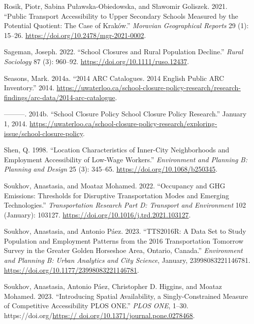 \documentclass[
default
]{sn-jnl}
\newlength{\cslhangindent}
\newenvironment{CSLReferences}[2] %
 {\begin{list}{}{%
  \setlength{\itemindent}{0pt}
  \setlength{\leftmargin}{0pt}
  \setlength{\parsep}{0pt}
  \ifodd #1
   \setlength{\leftmargin}{\cslhangindent}
   \setlength{\itemindent}{-1\cslhangindent}
  \fi
  \setlength{\itemsep}{#2\baselineskip}}}
 {\end{list}}
\begin{document}
\begin{CSLReferences}{1}{0}
Rosik, Piotr, Sabina Puławska-Obiedowska, and Sławomir Goliszek. 2021.
{``Public Transport Accessibility to Upper Secondary Schools Measured by
the Potential Quotient: The Case of Kraków.''} \emph{Moravian
Geographical Reports} 29 (1): 15--26.
\url{https://doi.org/10.2478/mgr-2021-0002}.

Sageman, Joseph. 2022. {``School Closures and Rural Population
Decline.''} \emph{Rural Sociology} 87 (3): 960--92.
\url{https://doi.org/10.1111/ruso.12437}.

Seasons, Mark. 2014a. {``2014 {ARC} Catalogues. 2014 English Public
{ARC} Inventory.''} 2014.
\url{https://uwaterloo.ca/school-closure-policy-research/research-findings/arc-data/2014-arc-catalogue}.

---------. 2014b. {``School Closure Policy {\textbar} School Closure
Policy Research.''} January 1, 2014.
\url{https://uwaterloo.ca/school-closure-policy-research/exploring-issue/school-closure-policy}.

Shen, Q. 1998. {``Location Characteristics of Inner-City Neighborhoods
and Employment Accessibility of Low-Wage Workers.''} \emph{Environment
and Planning B: Planning and Design} 25 (3): 345--65.
\url{https://doi.org/10.1068/b250345}.

Soukhov, Anastasia, and Moataz Mohamed. 2022. {``Occupancy and {GHG}
Emissions: Thresholds for Disruptive Transportation Modes and Emerging
Technologies.''} \emph{Transportation Research Part D: Transport and
Environment} 102 (January): 103127.
\url{https://doi.org/10.1016/j.trd.2021.103127}.

Soukhov, Anastasia, and Antonio Páez. 2023. {``{TTS}2016R: A Data Set to
Study Population and Employment Patterns from the 2016 Transportation
Tomorrow Survey in the Greater Golden Horseshoe Area, Ontario,
Canada.''} \emph{Environment and Planning B: Urban Analytics and City
Science}, January, 23998083221146781.
\url{https://doi.org/10.1177/23998083221146781}.

Soukhov, Anastasia, Antonio Páez, Christopher D. Higgins, and Moataz
Mohamed. 2023. {``Introducing Spatial Availability, a Singly-Constrained
Measure of Competitive Accessibility \textbar{} {PLOS ONE}.''}
\emph{PLOS ONE}, 1--30.
https://doi.org/\href{https://\%20doi.org/10.1371/journal.pone.0278468}{https://
doi.org/10.1371/journal.pone.0278468}.


\end{CSLReferences}
\end{document}
